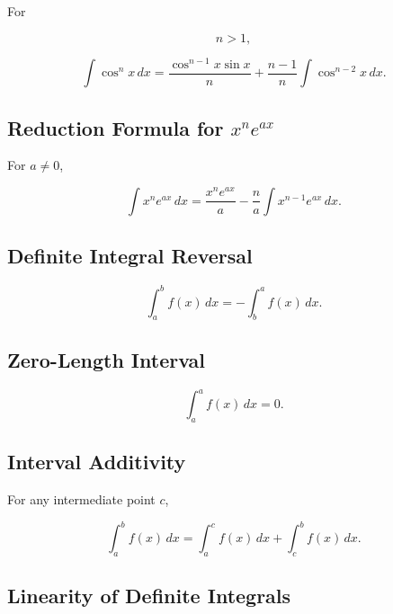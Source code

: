 For

\[
n>1,
\]

\[
\boxed{
\int\cos^n x\,dx
=
\frac{
\cos^{n-1}x\sin x
}{
n
}
+
\frac{
n-1
}{
n
}
\int
\cos^{n-2}x
\,dx.
}
\]

\subsection{Reduction Formula for \(x^n e^{ax}\)}
\label{subsec:power-exp-reduction}

For \(a\neq0\),

\[
\boxed{
\int
x^n e^{ax}
\,dx
=
\frac{
x^n e^{ax}
}{
a
}
-
\frac{
n
}{
a
}
\int
x^{n-1}e^{ax}
\,dx.
}
\]

\subsection{Definite Integral Reversal}
\label{subsec:definite-integral-reversal}

\[
\boxed{
\int_a^b f(x)\,dx
=
-
\int_b^a f(x)\,dx.
}
\]

\subsection{Zero-Length Interval}
\label{subsec:zero-length-integral}

\[
\boxed{
\int_a^a f(x)\,dx
=
0.
}
\]

\subsection{Interval Additivity}
\label{subsec:definite-integral-additivity}

For any intermediate point \(c\),

\[
\boxed{
\int_a^b f(x)\,dx
=
\int_a^c f(x)\,dx
+
\int_c^b f(x)\,dx.
}
\]

\subsection{Linearity of Definite Integrals}
\label{subsec:definite-integral-linearity}


